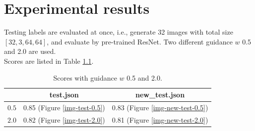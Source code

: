 \chapter{Experimental results}
\indent
	Testing labels are evaluated at once, i.e., generate 32 images with total size $[32, 3, 64, 64]$, 
	and evaluate by pre-trained ResNet. Two different guidance $w$ 0.5 and 2.0 are used. \\ 
	Scores are listed in Table \ref{scores}.
	\begin{table}[H]
		\centering
		\begin{tabular}{c|cc}
			\hline
			\diagbox[width=7em]{$w$}{Labels} & test.json & new\_test.json \\
			\hline
			$0.5$ & 0.85 (Figure \ref{img-test-0.5}) & 0.83 (Figure \ref{img-new-test-0.5}) \\
			$2.0$ & 0.82 (Figure \ref{img-test-2.0}) & 0.81 (Figure \ref{img-new-test-2.0}) \\
			\hline
		\end{tabular}
		\caption{Scores with guidance $w$ 0.5 and 2.0.}
		\label{scores}
	\end{table}

